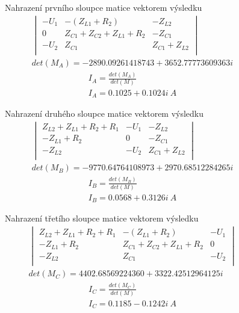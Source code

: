 \begin{figure}[h!]
    Nahrazení prvního sloupce matice vektorem výsledku
    \begin{gather*}
        \begin{vmatrix}
            - U_1 & - (Z_{L1} + R_2) & - Z_{L2} \\
            0 & Z_{C1} + Z_{C2} + Z_{L1} + R_2 & - Z_{C1} \\
            - U_2 & Z_{C1} & Z_{C1} + Z_{L2} \\
        \end{vmatrix}
        \\
        det(M_A) = -2890.09261418743 + 3652.77773609363i
    \end{gather*}
    \begin{gather*}
        I_A = \frac{det(M_A)}{det(M)} \\
        I_A = 0.1025 + 0.1024i \: A
    \end{gather*}
\end{figure}
\begin{figure}[h!]
    Nahrazení druhého sloupce matice vektorem výsledku
    \begin{gather*}
        \begin{vmatrix} 
            Z_{L2} + Z_{L1} + R_2 + R_1 & - U_1 & - Z_{L2} \\
            - Z_{L1} + R_2 & 0 & - Z_{C1} \\
            - Z_{L2} & -U_2 & Z_{C1} + Z_{L2} \\
        \end{vmatrix}
        \\
        det(M_B) = -9770.64764108973 + 2970.68512284265i
    \end{gather*}
    \begin{gather*}
        I_B = \frac{det(M_B)}{det(M)} \\
        I_B = 0.0568 + 0.3126i \: A
    \end{gather*}
\end{figure}
\begin{figure}[h!]
    Nahrazení třetího sloupce matice vektorem výsledku
    \begin{gather*}
        \begin{vmatrix}
            Z_{L2} + Z_{L1} + R_2 + R_1 & - (Z_{L1} + R_2) & - U_1 \\
            - Z_{L1} + R_2 & Z_{C1} + Z_{C2} + Z_{L1} + R_2 & 0 \\
            - Z_{L2} & Z_{C1} & - U_2 \\
        \end{vmatrix}
        \\
        det(M_C) = 4402.68569224360 + 3322.42512964125i
    \end{gather*}
    \begin{gather*}
        I_C = \frac{det(M_C)}{det(M)} \\
        I_C = 0.1185 - 0.1242i \: A
    \end{gather*}
\end{figure}
